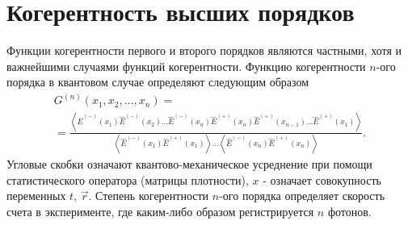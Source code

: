 \section{Когерентность высших порядков}
Функции когерентности первого и второго порядков являются частными,
хотя и важнейшими случаями функций когерентности. Функцию
когерентности $n$-ого порядка в квантовом случае определяют
следующим образом 
\begin{eqnarray}
G^{(n)}\left(x_1, x_2, \dots , x_n\right) =  
\nonumber \\
=
\frac{\left<
\hat{E}^{(-)}\left(x_1\right)
\hat{E}^{(-)}\left(x_2\right)
\dots
\hat{E}^{(-)}\left(x_n\right)
\hat{E}^{(+)}\left(x_{n}\right)
\hat{E}^{(+)}\left(x_{n - 1} \right)
\dots
\hat{E}^{(+)}\left(x_{1}\right)
\right>}
{
\left<
\hat{E}^{(-)}\left(x_1\right)
\hat{E}^{(+)}\left(x_1\right)
\right>
\dots
\left<
\hat{E}^{(-)}\left(x_{n}\right)
\hat{E}^{(+)}\left(x_{n}\right)
\right>
}.
\label{eqCh4_39}
\end{eqnarray}
Угловые скобки означают квантово-механическое усреднение при помощи
статистического оператора (матрицы плотности),  $x$ - означает
совокупность переменных $t$, $\vec{r}$. Степень когерентности $n$-ого
порядка определяет скорость счета в эксперименте, где каким-либо
образом регистрируется $n$ фотонов. 
